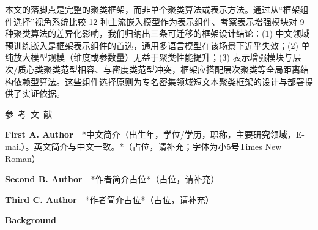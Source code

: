 \documentclass[10.5pt,compsoc,UTF8]{CjC}
\theoremstyle{mystyle}
\begin{document}
本文的落脚点是完整的聚类框架，而非单个聚类算法或表示方法。通过从``框架组件选择''视角系统比较 12 种主流嵌入模型作为表示组件、考察表示增强模块对 9 种聚类算法的差异化影响，我们归纳出三条可迁移的框架设计结论：(1) 中文领域预训练嵌入是框架表示组件的首选，通用多语言模型在该场景下近乎失效；(2) 单纯放大模型规模（维度或参数量）无益于聚类性能提升；(3) 表示增强模块与层次/质心类聚类范型相容、与密度类范型冲突，框架应搭配层次聚类等全局距离结构依赖型算法。这些组件选择原则为专名密集领域短文本聚类框架的设计与部署提供了实证依据。

\vspace {3mm}

\vspace {5mm}
\centerline
{\textsf{参~考~文~献}}
 \addtolength{\itemsep}{-1em}
\vspace {1.5mm}




\begin{biographynophoto}
\noindent
\textbf{First A. Author}\ \ *中文简介（出生年，学位/学历，职称，主要研究领域，E-mail）。英文简介与中文一致。*（占位，请补充；字体为小5号Times New Roman）
\end{biographynophoto}

\begin{biographynophoto}
\noindent
\textbf{Second B. Author}\ \ *作者简介占位*（占位，请补充）
\end{biographynophoto}

\begin{biographynophoto}
\noindent
\textbf{Third C. Author}\ \ *作者简介占位*（占位，请补充）
\end{biographynophoto}

\noindent \textbf{Background}
\end{document}
